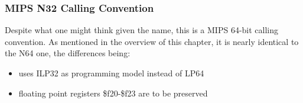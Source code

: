 \subsubsection{MIPS N32 Calling Convention}

Despite what one might think given the name, this is a MIPS 64-bit calling
convention. As mentioned in the overview of this chapter, it is nearly
identical to the N64 one, the differences being:

\begin{itemize}
\item uses ILP32 as programming model instead of LP64
\item floating point registers \$f20-\$f23 are to be preserved
\end{itemize}


